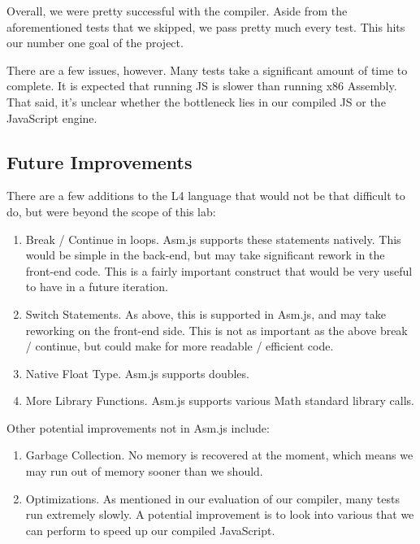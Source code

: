 \documentclass[twoside]{article}
\begin{document}
\begin{multicols}{2}
Overall, we were pretty successful with the compiler. Aside from the aforementioned
tests that we skipped, we pass pretty much every test. This hits our number one
goal of the project.

There are a few issues, however. Many tests take a significant amount of time to
complete. It is expected that running JS is slower than running x86 Assembly.
That said, it's unclear whether the bottleneck lies in our compiled JS or the
JavaScript engine.

\subsection{Future Improvements}

There are a few additions to the L4 language that would not be that difficult
to do, but were beyond the scope of this lab:

\begin{enumerate}
  \item Break / Continue in loops. Asm.js supports these statements natively.
    This would be simple in the back-end, but may take significant rework in the
    front-end code. This is a fairly important construct that would be very useful
    to have in a future iteration.
  \item Switch Statements. As above, this is supported in Asm.js, and may take
    reworking on the front-end side. This is not as important as the above break
    / continue, but could make for more readable / efficient code.
  \item Native Float Type. Asm.js supports doubles.
  \item More Library Functions. Asm.js supports various Math standard library
    calls.
\end{enumerate}

Other potential improvements not in Asm.js include:

\begin{enumerate}
  \item Garbage Collection. No memory is recovered at the moment, which means
    we may run out of memory sooner than we should.
  \item Optimizations. As mentioned in our evaluation of our compiler, many tests
    run extremely slowly. A potential improvement is to look into various
    that we can perform to speed up our compiled JavaScript.
\end{enumerate}


\end{multicols}
\end{document}
